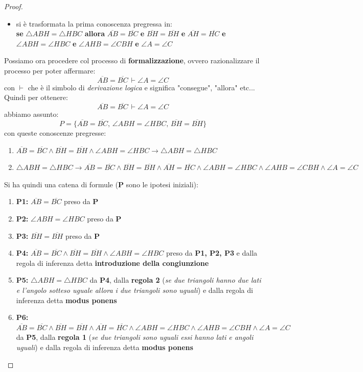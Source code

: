 \documentclass[a4paper,12pt, oneside]{book}
\begin{document}
\begin{proof}
\begin{itemize}
		\item si è trasformata la prima conoscenza pregressa in:\\
		      \textbf{se} $\triangle ABH=\triangle HBC$ \textbf{allora} $\overline{AB}=\overline{BC}$ \textbf{e} $\overline{BH}=\overline{BH}$ \textbf{e} $\overline{AH}=\overline{HC}$ \textbf{e} $\angle ABH = \angle HBC$ \textbf{e} $\angle AHB = \angle CBH$ \textbf{e} $\angle A=\angle C$
	\end{itemize}
	Possiamo ora procedere col processo di \textbf{formalizzazione}, ovvero razionalizzare il processo per poter affermare:
	$$\overline{AB}=\overline{BC}\,\vdash \angle A = \angle C$$
	con $\vdash$ che è il simbolo di \textit{derivazione logica} e significa "consegue", "allora" etc...\\
	Quindi per ottenere:
	$$\overline{AB}=\overline{BC}\,\vdash \angle A = \angle C$$
	abbiamo assunto:
	$$P=\{\overline{AB}=\overline{BC},\,\angle ABH = \angle HBC,\,\overline{BH}=\overline{BH}\}$$
	con queste conoscenze pregresse:
	\begin{enumerate}
		\item $\overline{AB}=\overline{BC}\wedge\overline{BH}=\overline{BH}\wedge\angle ABH = \angle HBC\to\triangle ABH=\triangle HBC$
		\item  $\triangle ABH=\triangle HBC\to\overline{AB}=\overline{BC}\wedge\overline{BH}=\overline{BH}\wedge\overline{AH}=\overline{HC}\wedge\angle ABH = \angle HBC\wedge\angle AHB = \angle CBH\wedge\angle A=\angle C$
	\end{enumerate}
	Si ha quindi una catena di formule (\textbf{P} sono le ipotesi iniziali):
	\begin{enumerate}
		\item \textbf{P1:} $\overline{AB}=\overline{BC}$ preso da \textbf{P}
		\item \textbf{P2:} $\angle ABH = \angle HBC$ preso da \textbf{P}
		\item \textbf{P3:} $\overline{BH}=\overline{BH}$ preso da \textbf{P}
		\item \textbf{P4:} $\overline{AB}=\overline{BC}\wedge\overline{BH}=\overline{BH}\wedge\angle ABH = \angle HBC$ preso da \textbf{P1, P2, P3} e dalla regola di inferenza detta \textbf{introduzione della congiunzione}
		\item \textbf{P5:} $\triangle ABH=\triangle HBC$ da \textbf{P4}, dalla \textbf{regola 2} (\textit{se due triangoli hanno due lati e l'angolo sotteso uguale allora i due triangoli sono uguali}) e dalla regola di inferenza detta \textbf{modus ponens}
		\item \textbf{P6:} $\overline{AB}=\overline{BC}\wedge\overline{BH}=\overline{BH}\wedge\overline{AH}=\overline{HC}\wedge\angle ABH = \angle HBC\wedge\angle AHB = \angle CBH\wedge\angle A=\angle C$ da \textbf{P5}, dalla \textbf{regola 1} (\textit{se due triangoli sono uguali essi hanno lati e angoli uguali}) e dalla regola di inferenza detta \textbf{modus ponens}

\end{enumerate}
\end{proof}
\end{document}
